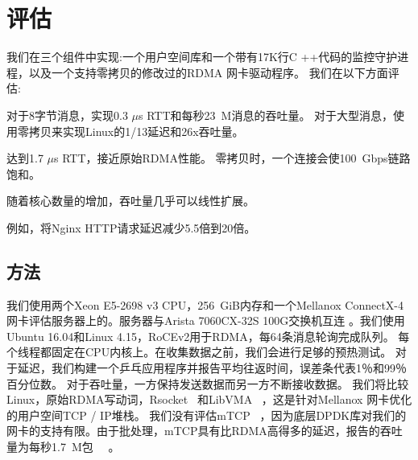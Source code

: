 \section{评估}
\label{socksdirect:sec:evaluation}



我们在三个组件中实现\sys :一个用户空间库\libipc {}和一个带有17K行C ++代码的监控守护进程，以及一个支持零拷贝的修改过的RDMA 网卡驱动程序。 我们在以下方面评估\sys :

对于8字节消息，\sys 实现0.3 $\mu$s RTT和每秒23~M消息的吞吐量。 对于大型消息，\sys 使用零拷贝来实现Linux的1/13延迟和26x吞吐量。

\sys 达到1.7 $\mu$s RTT，接近原始RDMA性能。
零拷贝时，一个连接会使100~Gbps链路饱和。



随着核心数量的增加，吞吐量几乎可以线性扩展。


例如，\sys  {}将Nginx HTTP请求延迟减少5.5倍到20倍。


\subsection{方法}
\label{socksdirect:subsec:methodology}

我们使用两个Xeon E5-2698 v3 CPU，256~GiB内存和一个Mellanox ConnectX-4网卡评估服务器上的\sys 。服务器与Arista 7060CX-32S 100G交换机互连 \cite {arista-7060cx}。我们使用Ubuntu 16.04和Linux 4.15，RoCEv2用于RDMA，每64条消息轮询完成队列。
每个线程都固定在CPU内核上。在收集数据之前，我们会进行足够的预热测试。
对于延迟，我们构建一个乒乓应用程序并报告平均往返时间，误差条代表1％和99％百分位数。
对于吞吐量，一方保持发送数据而另一方不断接收数据。
我们将比较Linux，原始RDMA写动词，Rsocket~ \cite {rsockets}和LibVMA~ \cite {libvma}，这是针对Mellanox 网卡优化的用户空间TCP / IP堆栈。
我们没有评估mTCP~ \cite {jeong2014mtcp}，因为底层DPDK库对我们的网卡的支持有限。由于批处理，mTCP具有比RDMA高得多的延迟，报告的吞吐量为每秒1.7~M包~~ \cite {kalia2018datacenter}。

